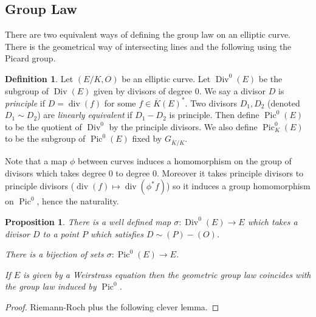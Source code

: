 \documentclass[11pt]{article}
\newcommand{\Div}{\operatorname{Div}}
\renewcommand{\div}{\operatorname{div}} %
\newcommand{\Pic}{\operatorname{Pic}}
\theoremstyle{plain}%
\newtheorem{prop}[thm]{Proposition}
\theoremstyle{definition}
\newtheorem{defn}[thm]{Definition}
\theoremstyle{remark}
\begin{document}
\subsection{Group Law}

There are two equivalent ways of defining the group law on an elliptic curve. There is the geometrical way of intersecting lines and the following using the Picard group.

\begin{defn} %
	Let $(E/K,O)$ be an elliptic curve. Let $\Div^0(E)$ be the subgroup of $\Div(E)$ given by divisors of degree $0$. We say a divisor $D$ is \emph{principle} if $D = \div(f)$ for some $f\in \overline{K}(E)^*$. Two divisors $D_1,D_2$ (denoted $D_1\sim D_2$) are \emph{linearly equivalent} if $D_1 - D_2$ is principle. Then define
	$
	\Pic^0(E)  %
	$
	to be the quotient of $\Div^0$ by the principle divisors. We also define $\Pic^0_K(E)$ to be the subgroup of $\Pic^0(E)$ fixed by $G_{\overline{K}/K}$.
\end{defn}

Note that a map $\phi$ between curves induces a homomorphism on the group of divisors which takes degree $0$ to degree $0$. Moreover it takes principle divisors to principle divisors ($\div(f) \mapsto \div(\phi^*f)$) so it induces a group homomorphism on $\Pic^0$, hence the naturality.

\begin{prop} %
	There is a well defined map $\sigma:\Div^0(E)\to E$ which takes a divisor $D$ to a point $P$ which satisfies $D\sim(P) - (O)$.

	There is a bijection of sets $\sigma: \Pic^0(E)\to E$.

	If $E$ is given by a Weirstrass equation then the geometric group law coincides with the group law induced by $\Pic^0$.
\end{prop}
\begin{proof}
	Riemann-Roch plus the following clever lemma.
\end{proof}
\end{document}
